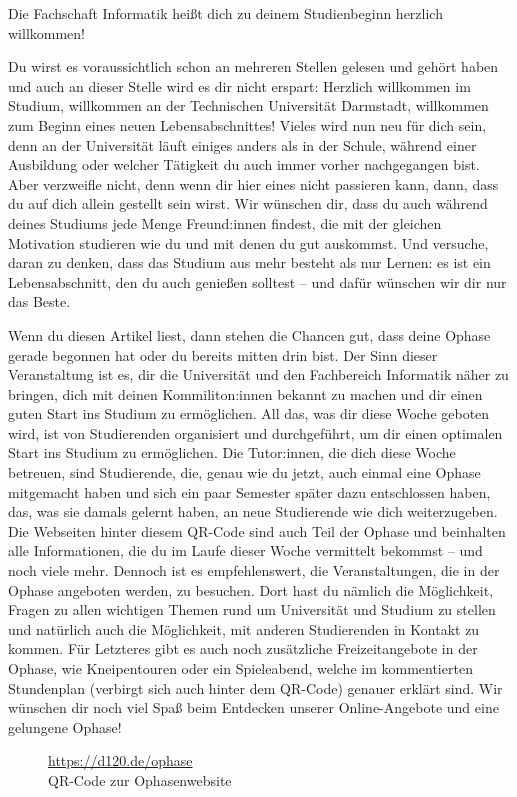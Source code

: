 %
{
    Die Fachschaft Informatik heißt dich zu deinem Studienbeginn herzlich willkommen!

    Du wirst es voraussichtlich schon an mehreren Stellen gelesen und gehört haben und auch an dieser Stelle wird es dir nicht erspart: Herzlich willkommen im Studium, willkommen an der Technischen Universität Darmstadt, willkommen zum Beginn eines neuen Lebensabschnittes! Vieles wird nun neu für dich sein, denn an der Universität läuft einiges anders als in der Schule, während einer Ausbildung oder welcher Tätigkeit du auch immer vorher nachgegangen bist. Aber verzweifle nicht, denn wenn dir hier eines nicht passieren kann, dann, dass du auf dich allein gestellt sein wirst. Wir wünschen dir, dass du auch während deines Studiums jede Menge Freund:innen findest, die mit der gleichen Motivation studieren wie du und mit denen du gut auskommst. Und versuche, daran zu denken, dass das Studium aus mehr besteht als nur Lernen: es ist ein Lebensabschnitt, den du auch genießen solltest – und dafür wünschen wir dir nur das Beste.

    Wenn du diesen Artikel liest, dann stehen die Chancen gut, dass deine Ophase gerade begonnen hat oder du bereits mitten drin bist. Der Sinn dieser Veranstaltung ist es, dir die Universität und den Fachbereich Informatik näher zu bringen, dich mit deinen Kommiliton:innen bekannt zu machen und dir einen guten Start ins Studium zu ermöglichen. All das, was dir diese Woche geboten wird, ist von Studierenden organisiert und durchgeführt, um dir einen optimalen Start ins Studium zu ermöglichen. Die Tutor:innen, die dich diese Woche betreuen, sind Studierende, die, genau wie du jetzt, auch einmal eine Ophase mitgemacht haben und sich ein paar Semester später dazu entschlossen haben, das, was sie damals gelernt haben, an neue Studierende wie dich weiterzugeben. Die Webseiten hinter diesem QR-Code sind auch Teil der Ophase und beinhalten alle Informationen, die du im Laufe dieser Woche vermittelt bekommst – und noch viele mehr. Dennoch ist es empfehlenswert, die Veranstaltungen, die in der Ophase angeboten werden, zu besuchen. Dort hast du nämlich die Möglichkeit, Fragen zu allen wichtigen Themen rund um Universität und Studium zu stellen und natürlich auch die Möglichkeit, mit anderen Studierenden in Kontakt zu kommen. Für Letzteres gibt es auch noch zusätzliche Freizeitangebote in der Ophase, wie Kneipentouren oder ein Spieleabend, welche im kommentierten Stundenplan (verbirgt sich auch hinter dem QR-Code) genauer erklärt sind. Wir wünschen dir noch viel Spaß beim Entdecken unserer Online-Angebote und eine gelungene Ophase!
}
{
    \vspace{\fill}
    \begin{figure}[ht!]
        \centering
        \caption*{\large\url{https://d120.de/ophase}\\QR-Code zur Ophasenwebsite}
    \end{figure}
    \vspace{\fill}
}{}

\newpage
